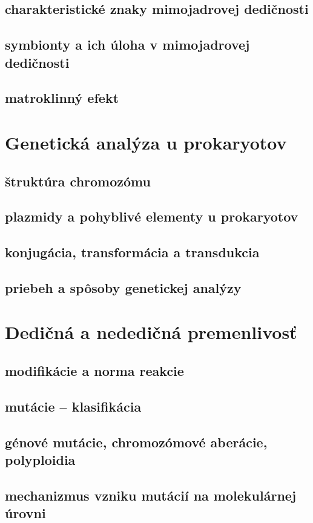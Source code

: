 \subsection*{charakteristické znaky mimojadrovej dedičnosti}
\subsection*{symbionty a ich úloha v mimojadrovej dedičnosti}
\subsection*{matroklinný efekt}

\section{Genetická analýza u prokaryotov}
\subsection*{štruktúra chromozómu}
\subsection*{plazmidy a pohyblivé elementy u prokaryotov}
\subsection*{konjugácia, transformácia a transdukcia}
\subsection*{priebeh a spôsoby genetickej analýzy}

\section{Dedičná a nededičná premenlivosť}
\subsection*{modifikácie a norma reakcie}
\subsection*{mutácie -- klasifikácia}
\subsection*{génové mutácie, chromozómové aberácie, polyploidia}
\subsection*{mechanizmus vzniku mutácií na molekulárnej úrovni}
